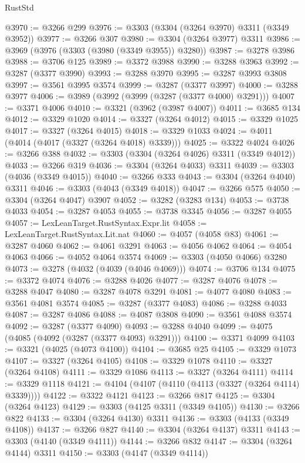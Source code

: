 \begin{lexlean}{RustStd}
\begin{coremodule}
{\begin{coremodule}
{{{{{{{{{{{{{{{{{{{{{{{{{{{{{{{{{@3970 := @3266 @299
@3976 := @3303 (@3304 (@3264 @3970) @3311 (@3349 @3952))
@3977 := @3266 @307
@3980 := @3304 (@3264 @3977) @3311
@3986 := @3969 (@3976 (@3303 (@3980 (@3349 @3955)) @3280))
@3987 := @3278 @3986
@3988 := @3706 @125
@3989 := @3372 @3988
@3990 := @3288 @3963
@3992 := @3287 (@3377 @3990)
@3993 := @3288 @3970
@3995 := @3287 @3993 @3808
@3997 := @3561 @3995 @3574
@3999 := @3287 (@3377 @3997)
@4000 := @3288 @3977
@4006 := @3989 (@3992 (@3999 (@3287 (@3377 @4000) @3291)))
@4007 := @3371 @4006
@4010 := @3321 (@3962 (@3987 @4007))
@4011 := @3685 @134
@4012 := @3329 @1020
@4014 := @3327 (@3264 @4012)
@4015 := @3329 @1025
@4017 := @3327 (@3264 @4015)
@4018 := @3329 @1033
@4024 := @4011 (@4014 (@4017 (@3327 (@3264 @4018) @3339)))
@4025 := @3322 @4024
@4026 := @3266 @388
@4032 := @3303 (@3304 (@3264 @4026) @3311 (@3349 @4012))
@4033 := @3266 @319
@4036 := @3304 (@3264 @4033) @3311
@4039 := @3303 (@4036 (@3349 @4015))
@4040 := @3266 @333
@4043 := @3304 (@3264 @4040) @3311
@4046 := @3303 (@4043 (@3349 @4018))
@4047 := @3266 @575
@4050 := @3304 (@3264 @4047) @3907
@4052 := @3282 (@3283 @134)
@4053 := @3738 @4033
@4054 := @3287 @4053
@4055 := @3738 @3345
@4056 := @3287 @4055
@4057 := LexLeanTarget.RustSyntax.Expr.lit
@4058 := LexLeanTarget.RustSyntax.Lit.nat
@4060 := @4057 (@4058 @83)
@4061 := @3287 @4060
@4062 := @4061 @3291
@4063 := @4056 @4062
@4064 := @4054 @4063
@4066 := @4052 @4064 @3574
@4069 := @3303 (@4050 @4066) @3280
@4073 := @3278 (@4032 (@4039 (@4046 @4069)))
@4074 := @3706 @134
@4075 := @3372 @4074
@4076 := @3288 @4026
@4077 := @3287 @4076
@4078 := @3288 @4047
@4080 := @3287 @4078 @3291
@4081 := @4077 @4080
@4083 := @3561 @4081 @3574
@4085 := @3287 (@3377 @4083)
@4086 := @3288 @4033
@4087 := @3287 @4086
@4088 := @4087 @3808
@4090 := @3561 @4088 @3574
@4092 := @3287 (@3377 @4090)
@4093 := @3288 @4040
@4099 := @4075 (@4085 (@4092 (@3287 (@3377 @4093) @3291)))
@4100 := @3371 @4099
@4103 := @3321 (@4025 (@4073 @4100))
@4104 := @3685 @25
@4105 := @3329 @1073
@4107 := @3327 (@3264 @4105)
@4108 := @3329 @1078
@4110 := @3327 (@3264 @4108)
@4111 := @3329 @1086
@4113 := @3327 (@3264 @4111)
@4114 := @3329 @1118
@4121 := @4104 (@4107 (@4110 (@4113 (@3327 (@3264 @4114) @3339))))
@4122 := @3322 @4121
@4123 := @3266 @817
@4125 := @3304 (@3264 @4123)
@4129 := @3303 (@4125 @3311 (@3349 @4105))
@4130 := @3266 @822
@4133 := @3304 (@3264 @4130) @3311
@4136 := @3303 (@4133 (@3349 @4108))
@4137 := @3266 @827
@4140 := @3304 (@3264 @4137) @3311
@4143 := @3303 (@4140 (@3349 @4111))
@4144 := @3266 @832
@4147 := @3304 (@3264 @4144) @3311
@4150 := @3303 (@4147 (@3349 @4114))
}}}}}}}}}}}}}}}}}}}}}}}}}}}}}}}}}
\end{coremodule}}
\end{coremodule}
\end{lexlean}
